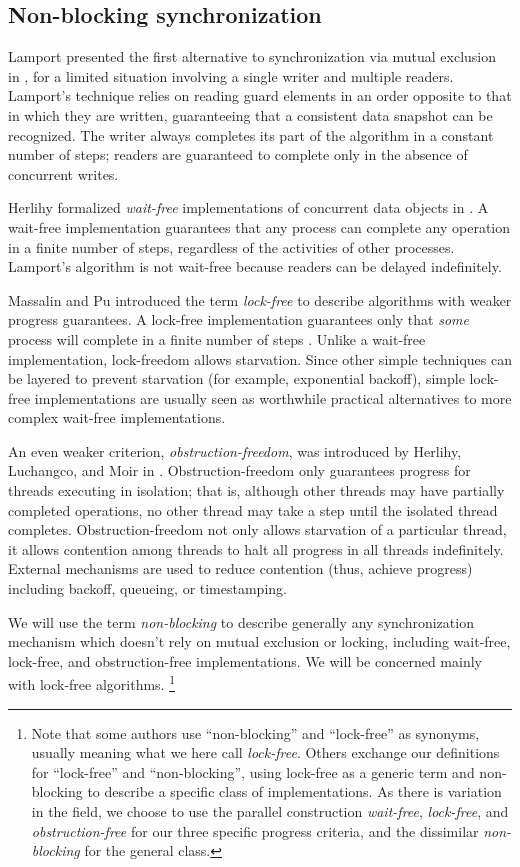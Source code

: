 \documentclass[12pt]{article}
\newcommand{\subsecput}[2]{\subsection{#2}\label{sec:#1}}
\begin{document}
\subsecput{nb-sync}{Non-blocking synchronization}

Lamport presented the first alternative to synchronization via mutual
exclusion in \cite{Lamport77}, for a limited situation involving a single
writer and multiple readers.  Lamport's technique relies on reading
guard elements in an order opposite to that in which they are written,
guaranteeing that a consistent data snapshot can be recognized.  The
writer always completes its part of the algorithm in a constant number
of steps; readers are guaranteed to complete only in the absence of
concurrent writes.

Herlihy formalized \emph{wait-free} implementations of
concurrent data objects in \cite{Herlihy88}.  A wait-free implementation
guarantees that any process can complete any operation in a finite
number of steps, regardless of the activities of other processes.
Lamport's algorithm is not wait-free
because readers can be delayed indefinitely.

Massalin and Pu introduced the term \emph{lock-free} to describe 
algorithms with weaker progress guarantees.
A lock-free implementation guarantees only that \emph{some}
process will complete in a finite number of steps
\cite{MassalinPu91}.  Unlike a wait-free implementation,
lock-freedom allows starvation.  Since other simple techniques can be
layered to prevent starvation (for example, exponential backoff),
simple lock-free implementations are usually seen as worthwhile practical
alternatives to more complex wait-free implementations.

An even weaker criterion, \emph{obstruction-freedom}, was introduced
by Herlihy, Luchangco, and Moir in \cite{HerlihyLuMo03}.
Obstruction-freedom only guarantees progress for threads executing in
isolation; that is, although other threads may have partially
completed operations, no other thread may take a step until the
isolated thread completes.  Obstruction-freedom not only allows
starvation of a particular thread, it allows contention among threads
to halt all progress in all threads
indefinitely.  External mechanisms are used to reduce contention
(thus, achieve progress) including backoff, queueing, or timestamping.

We will use the term \emph{non-blocking} to describe
generally any synchronization mechanism which doesn't rely on mutual
exclusion or locking, including wait-free, lock-free,
and obstruction-free implementations.
We will be concerned mainly with lock-free algorithms.%
\footnote{Note that some authors use ``non-blocking'' and
  ``lock-free'' as synonyms, usually meaning what we here call
  \emph{lock-free}.  Others exchange our definitions for ``lock-free''
  and ``non-blocking'', using lock-free as a generic term and non-blocking
  to describe a specific class of implementations.  As there is
  variation in the field, we choose to use the parallel construction
  \emph{wait-free}, \emph{lock-free}, and \emph{obstruction-free} for
  our three specific progress criteria, and the dissimilar
  \emph{non-blocking} for the general class.}
\end{document}
